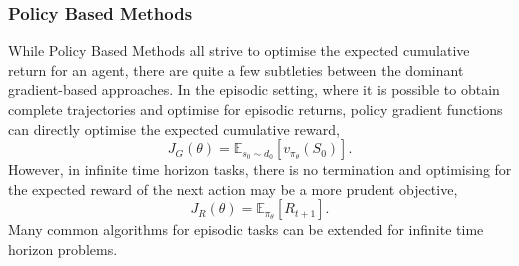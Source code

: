 \subsubsection{Policy Based Methods}
While Policy Based Methods all strive to optimise the expected cumulative return for an agent, there are quite a few subtleties between the dominant gradient-based approaches. In the episodic setting, where it is possible to obtain complete trajectories and optimise for episodic returns, policy gradient functions can directly optimise the expected cumulative reward,
\begin{equation}
	J_G(\theta) = \mathbb{E}_{s_0 \sim d_0}\left[v_{\pi_{\theta}}(S_0)\right].
\end{equation}
However, in infinite time horizon tasks, there is no termination and optimising for the expected reward of the next action may be a more prudent objective,
\begin{equation}
	J_R(\theta)
	= \mathbb{E}_{\pi_{\theta}}\left[R_{t+1}\right].
\end{equation}
Many common algorithms for episodic tasks can be extended for infinite time horizon problems.

